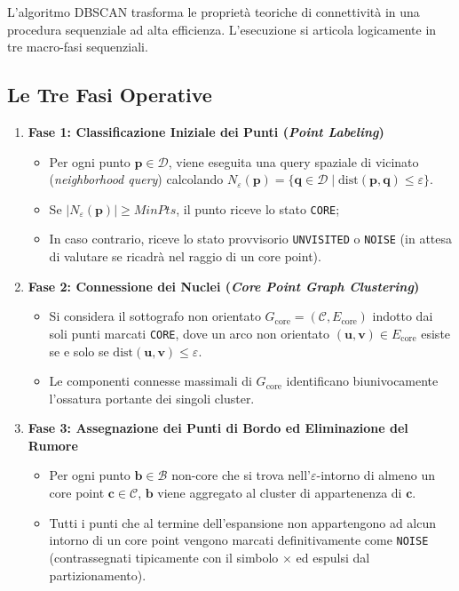 L'algoritmo DBSCAN trasforma le proprietà teoriche di connettività in una procedura sequenziale ad alta efficienza. L'esecuzione si articola logicamente in tre macro-fasi sequenziali.

\subsection{Le Tre Fasi Operative}

\begin{enumerate}
    \item \textbf{Fase 1: Classificazione Iniziale dei Punti (\textit{Point Labeling})}
    \begin{itemize}[noitemsep]
        \item Per ogni punto $\mathbf{p} \in \mathcal{D}$, viene eseguita una query spaziale di vicinato (\textit{neighborhood query}) calcolando $N_\varepsilon(\mathbf{p}) = \{\mathbf{q} \in \mathcal{D} \mid \mathrm{dist}(\mathbf{p}, \mathbf{q}) \le \varepsilon\}$.
        \item Se $|N_\varepsilon(\mathbf{p})| \ge MinPts$, il punto riceve lo stato \texttt{CORE};
        \item In caso contrario, riceve lo stato provvisorio \texttt{UNVISITED} o \texttt{NOISE} (in attesa di valutare se ricadrà nel raggio di un core point).
    \end{itemize}

    \item \textbf{Fase 2: Connessione dei Nuclei (\textit{Core Point Graph Clustering})}
    \begin{itemize}[noitemsep]
        \item Si considera il sottografo non orientato $G_{\mathrm{core}} = (\mathcal{C}, E_{\mathrm{core}})$ indotto dai soli punti marcati \texttt{CORE}, dove un arco non orientato $(\mathbf{u}, \mathbf{v}) \in E_{\mathrm{core}}$ esiste se e solo se $\mathrm{dist}(\mathbf{u}, \mathbf{v}) \le \varepsilon$.
        \item Le componenti connesse massimali di $G_{\mathrm{core}}$ identificano biunivocamente l'ossatura portante dei singoli cluster.
    \end{itemize}

    \item \textbf{Fase 3: Assegnazione dei Punti di Bordo ed Eliminazione del Rumore}
    \begin{itemize}[noitemsep]
        \item Per ogni punto $\mathbf{b} \in \mathcal{B}$ non-core che si trova nell'$\varepsilon$-intorno di almeno un core point $\mathbf{c} \in \mathcal{C}$, $\mathbf{b}$ viene aggregato al cluster di appartenenza di $\mathbf{c}$.
        \item Tutti i punti che al termine dell'espansione non appartengono ad alcun intorno di un core point vengono marcati definitivamente come \texttt{NOISE} (contrassegnati tipicamente con il simbolo $\times$ ed espulsi dal partizionamento).
    \end{itemize}
\end{enumerate}

